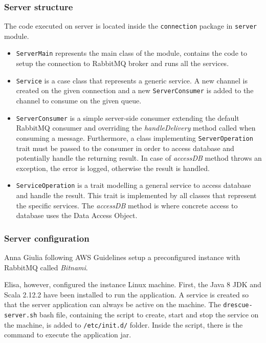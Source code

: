 \documentclass[a4paper,12pt]{report}
\begin{document}
\subsubsection{Server structure}
The code executed on server is located inside the \texttt{connection} package in \texttt{server} module.

\begin{itemize}
\item \texttt{ServerMain} represents the main class of the module, contains the code to setup the connection to RabbitMQ broker and runs all the services.
\item \texttt{Service} is a case class that represents a generic service. A new channel is created on the given connection and a new \texttt{ServerConsumer} is added to the channel to consume on the given queue.
\item \texttt{ServerConsumer} is a simple server-side consumer extending the default RabbitMQ consumer and overriding the \emph{handleDelivery} method called when consuming a message. Furthermore, a class implementing \texttt{ServerOperation} trait must be passed to the consumer in order to access database and potentially handle the returning result. In case of \emph{accessDB} method throws an exception, the error is logged, otherwise the result is handled. 
\item \texttt{ServiceOperation} is a trait modelling a general service to access database and handle the result. This trait is implemented by all classes that represent the specific services. The \emph{accessDB} method is where concrete access to database uses the Data Access Object.
\end{itemize}

\subsubsection{Server configuration}
Anna Giulia following AWS Guidelines setup a preconfigured instance with RabbitMQ called \emph{Bitnami}.

Elisa, however, configured the instance Linux machine. First, the Java 8 JDK and Scala 2.12.2 have been installed to run the application. A service is created so that the server application can always be active on the machine. The \texttt{drescue-server.sh} bash file, containing the script to create, start and stop the service on the machine, is added to \texttt{/etc/init.d/} folder. Inside the script, there is the command to execute the application jar.
\end{document}
